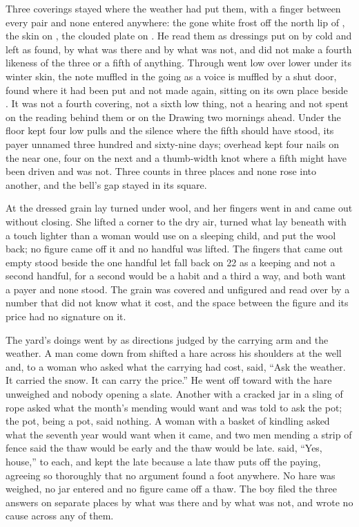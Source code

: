 Three coverings stayed where the weather had put them, with a finger between every pair and none entered anywhere: the gone white frost off the north lip of , the skin on , the clouded plate on . He read them as dressings put on by cold and left as found, by what was there and by what was not, and did not make a fourth likeness of the three or a fifth of anything. Through   went low over lower under its winter skin, the note muffled in the going as a voice is muffled by a shut door, found where it had been put and not made again, sitting on its own place beside . It was not a fourth covering, not a sixth low thing, not a hearing and not spent on the reading behind them or on the Drawing two mornings ahead. Under the floor  kept four low pulls and the silence where the fifth should have stood, its payer unnamed three hundred and sixty-nine days; overhead  kept four nails on the near one, four on the next and a thumb-width knot where a fifth might have been driven and was not. Three counts in three places and none rose into another, and the bell's gap stayed in its square.

\scenebreak

At  the dressed grain lay turned under wool, and her fingers went in and came out without closing. She lifted a corner to the dry air, turned what lay beneath with a touch lighter than a woman would use on a sleeping child, and put the wool back; no figure came off it and no handful was lifted. The fingers that came out empty stood beside the one handful let fall back on  22 as a keeping and not a second handful, for a second would be a habit and a third a way, and both want a payer and none stood. The grain was covered and unfigured and read over by a number that did not know what it cost, and the space between the figure and its price had no signature on it.

The yard's doings went by as directions judged by the carrying arm and the weather. A man come down from  shifted a hare across his shoulders at the well and, to a woman who asked what the carrying had cost, said, “Ask the weather. It carried the snow. It can carry the price.” He went off toward  with the hare unweighed and nobody opening a slate. Another with a cracked jar in a sling of rope asked what the month's mending would want and was told to ask the pot; the pot, being a pot, said nothing. A woman with a basket of kindling asked what the seventh year would want when it came, and two men mending a strip of fence said the thaw would be early and the thaw would be late.  said, “Yes, house,” to each, and kept the late because a late thaw puts off the paying, agreeing so thoroughly that no argument found a foot anywhere. No hare was weighed, no jar entered and no figure came off a thaw. The boy filed the three answers on separate places by what was there and by what was not, and wrote no cause across any of them.

